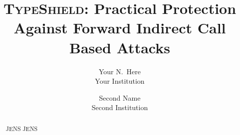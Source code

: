 \documentclass[sigconf, anonymous]{acmart}
\begin{document}

\title{\textsc{TypeShield}: Practical Protection Against Forward Indirect Call Based Attacks}


\author{
{\rm Your N.\ Here}\\
Your Institution
\and
{\rm Second Name}\\
Second Institution
} %



\thispagestyle{plain}
\pagestyle{plain}

\thispagestyle{empty}


\begin{abstract}
 
JENS JENS
\end{abstract}


\maketitle
	











\listoftodos







% 
\end{document}
